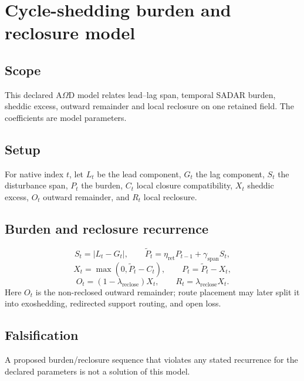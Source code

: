 \section{Cycle-shedding burden and reclosure model}
\label{app:cycle-shedding-demonstration}

\subsection{Scope}
\label{app:cycle-shedding-demo-scope}
This declared A\(\Omega\)D model relates lead--lag span, temporal SADAR
burden, sheddic excess, outward remainder and local reclosure on one retained
field. The coefficients are model parameters.

\subsection{Setup}
\label{app:cycle-shedding-demo-setup}
For native index \(t\), let \(L_t\) be the lead component, \(G_t\) the lag component, \(S_t\) the disturbance span, \(P_t\) the burden, \(C_t\) local closure compatibility, \(X_t\) sheddic excess, \(O_t\) outward remainder, and \(R_t\) local reclosure.

\subsection{Burden and reclosure recurrence}
\label{app:cycle-shedding-demo-statements}
\[
S_t=|L_t-G_t|,
\qquad
\widetilde P_t=\eta_{\mathrm{ret}} P_{t-1}+\gamma_{\mathrm{span}} S_t,
\]
\[
X_t=\max(0,\widetilde P_t-C_t),
\qquad
P_t=\widetilde P_t-X_t,
\]
\[
O_t=(1-\lambda_{\mathrm{reclose}})X_t,
\qquad
R_t=\lambda_{\mathrm{reclose}}X_t.
\]
Here \(O_t\) is the non-reclosed outward remainder; route placement may later split it into exoshedding, redirected support routing, and open loss.

\subsection{Falsification}
\label{app:cycle-shedding-demo-falsification}
A proposed burden/reclosure sequence that violates any stated recurrence
for the declared parameters is not a solution of this model.

